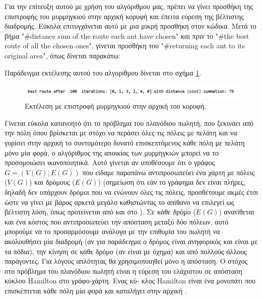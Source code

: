 Για την επίτευξη αυτού με χρήση του αλγόριθμου μας, πρέπει να γίνει προσθήκη της επιστροφής του μυρμηγκιού στην αρχική κορυφή και έπειτα εύρεση της βέλτιστης διαδρομής. Εύκολα επιτυγχάνεται αυτό με μια μικρή προσθήκη στον κώδικα. Μετά το βήμα "\#distance sum of the route each ant have chosen" και πριν το "\#the best route of all the chosen ones", γίνεται προσθήκη του "\#returning each ant to its original area", όπως δίνεται παρακάτω:

Παράδειγμα εκτέλεσης αυτού του αλγορίθμου δίνεται στο σχήμα \ref{exret}.
\begin{figure}
    \centering
    \includegraphics[scale=0.55]{2947_thesis/pictures/ex7.png} 
    \caption{Εκτέλεση με επιστροφή μυρμηγκιού στην αρχική του κορυφή.}
    \label{exret}
\end{figure}

Γίνεται εύκολα κατανοητό ότι το πρόβλημα του πλανόδιου πωλητή, που ξεκινάει από την πόλη όπου βρίσκεται με στόχο να περάσει όλες τις πόλεις με πελάτη και να γυρίσει στην αρχική το συντομότερο δυνατό επισκεπτόμενος κάθε πόλη με πελάτη μόνο μία φορά, ο αλγόριθμος της αποικίας των μυρμηγκιών μπορεί να το προσομοιώσει ικανοποιητικά. 
Αυτό γίνεται αν υποθέσουμε ότι ο γράφος $G=(V(G), E(G))$  που είδαμε παραπάνω αντιπροσωπεύει ένα χάρτη με πόλεις ($V(G)$) και δρόμους ($E(G)$) (σημείωση ότι εάν το γράφημα δεν είναι πλήρες, δηλαδή δεν υπάρχουν δρόμοι που να ενώνουν όλες τις πόλεις, προσθέτουμε ακμές έτσι ώστε να γίνει με βάρος αρκετά μεγάλο καθιστώντας το απίθανο να επιλεγεί ως βέλτιστη λύση, όπως προτείνεται από  και  στο \cite{dorigo2004ant}). Σε κάθε δρόμο ($E(G)$) ανατίθεται και ένα κόστος που αντιπροσωπεύει την απόσταση μεταξύ δύο πόλεων, αυτό μπορούμε να το προσαρμόσουμε ανάλογα με την επιθυμία του πωλητή να ακολουθήσει μία διαδρομή (αν για παράδειγμα ο δρόμος είναι ανηφορικός και είναι με τα πόδια), την κίνηση σε κάθε δρόμο (αν είναι με όχημα) και από πολλούς άλλους παράγοντες. Για λόγους απλότητας θα χρησιμοποιηθεί μόνο η απόσταση. Ο στόχος στο πρόβλημα του πλανόδιου πωλητή είναι η εύρεση του ελάχιστου σε απόσταση κύκλου Hamilton στο γράφο-χάρτη. Ενας κύ- κλος Hamilton είναι ένα μονοπάτι που επισκέπτεται κάθε πόλη μία φορά και καταλήγει στην αρχική \cite{dorigo2004ant}.

